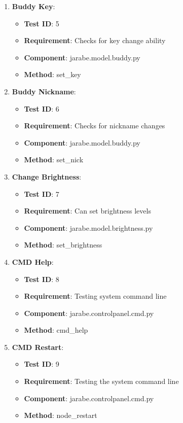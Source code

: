 \documentclass{article}
\begin{document}
\begin{enumerate}[noitemsep,topsep=0pt]
\begin{itemize}[noitemsep,topsep=0pt]
\end{itemize}
\item \textbf{Buddy Key}:
\begin{itemize}[noitemsep,topsep=0pt]
\item \textbf{Test ID}: 5
\item \textbf{Requirement}: Checks for key change ability
\item \textbf{Component}: jarabe.model.buddy.py
\item \textbf{Method}: set\_key
\end{itemize}
\item \textbf{Buddy Nickname}:
\begin{itemize}[noitemsep,topsep=0pt]
\item \textbf{Test ID}: 6
\item \textbf{Requirement}: Checks for nickname changes
\item \textbf{Component}: jarabe.model.buddy.py
\item \textbf{Method}: set\_nick
\end{itemize}
\item \textbf{Change Brightness}:
\begin{itemize}[noitemsep,topsep=0pt]
\item \textbf{Test ID}: 7
\item \textbf{Requirement}: Can set brightness levels
\item \textbf{Component}: jarabe.model.brightness.py
\item \textbf{Method}: set\_brightness
\end{itemize}
\item \textbf{CMD Help}:
\begin{itemize}[noitemsep,topsep=0pt]
\item \textbf{Test ID}: 8
\item \textbf{Requirement}: Testing system command line 
\item \textbf{Component}: jarabe.controlpanel.cmd.py
\item \textbf{Method}: cmd\_help
\end{itemize}
\item \textbf{CMD Restart}:
\begin{itemize}[noitemsep,topsep=0pt]
\item \textbf{Test ID}: 9
\item \textbf{Requirement}: Testing the system command line
\item \textbf{Component}: jarabe.controlpanel.cmd.py
\item \textbf{Method}: node\_restart

\end{itemize}
\end{enumerate}
\end{document}

